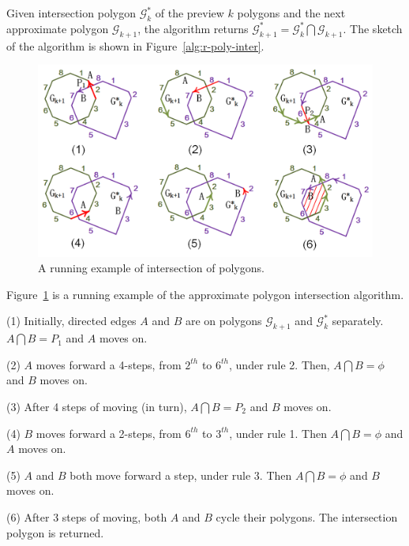 \stitle{\textcolor[rgb]{0.00,0.07,1.00}{Regular polygon intersection algorithm}}
Given intersection polygon $\mathcal{G}^*_k$ of the preview $k$ polygons and the next approximate polygon $\mathcal{G}_{k+1}$, the algorithm returns $\mathcal{G}^*_{k+1} = \mathcal{G}^*_k  \bigcap \mathcal{G}_{k+1}$.
The sketch of the algorithm is shown in Figure~\ref{alg:r-poly-inter}.







\begin{figure}[tb!]
\centering
\includegraphics[scale=0.88]{figures/Fig-r-poly-inter.png}
\vspace{-1ex}
\caption{\small A running example of intersection of polygons.}
\vspace{-2ex}
\label{fig:r-poly-inter}
\end{figure}




\begin{example}
Figure~\ref{fig:r-poly-inter} is a running example of the approximate polygon intersection algorithm.

\ni (1) Initially, directed edges $A$ and $B$ are on polygons $\mathcal{G}_{k+1}$ and $\mathcal{G}^*_{k}$ separately. $A \bigcap B = P_1$ and $A$ moves on.

\ni (2) $A$ moves forward a 4-steps, from $2^{th}$ to $6^{th}$, under rule 2. Then, $A \bigcap B = \phi$ and $B$ moves on.

\ni (3) After 4 steps of moving (in turn), $A \bigcap B = P_2$ and $B$ moves on.

\ni (4) $B$ moves forward a 2-steps, from $6^{th}$ to $3^{th}$, under rule 1. Then $A \bigcap B = \phi$ and $A$ moves on.

\ni (5) $A$ and $B$ both move forward a step, under rule 3. Then $A \bigcap B = \phi$ and $B$ moves on.

\ni (6) After 3 steps of moving, both $A$ and $B$ cycle their polygons. The intersection polygon is returned.
\end{example}






